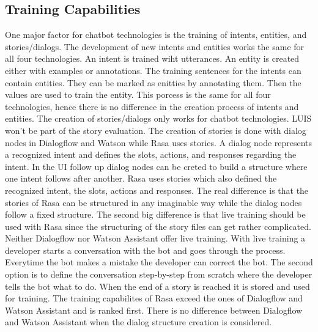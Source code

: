 \subsection*{Training Capabilities}
One major factor for chatbot technologies is the training of intents, entities, and stories/dialogs.
The development of new intents and entities works the same for all four technologies.
An intent is trained wiht utterances.
An entity is created either with examples or annotations.
The training sentences for the intents can contain entities.
They can be marked as enitties by annotating them.
Then the values are used to train the entity.
This porcess is the same for all four technologies, hence there is no 
difference in the creation process of intents and entities.
The creation of stories/dialogs only works for chatbot technologies.
LUIS won't be part of the story evaluation.
The creation of stories is done with dialog nodes in Dialogflow and Watson while
Rasa uses stories.
A dialog node represents a recognized intent and defines the slots, actions, and responses regarding 
the intent.
In the UI follow up dialog nodes can be creted to build a structure where one intent follows after another.
Rasa uses stories which also defined the recognized intent, the slots, actions and responses.
The real difference is that the stories of Rasa can be structured in any imaginable way while the 
dialog nodes follow a fixed structure.
The second big difference is that live training should be used with Rasa since the structuring of the story files can get 
rather complicated.
Neither Dialogflow nor Watson Assistant offer live training.
With live training a developer starts a conversation with the bot and goes through the process.
Everytime the bot makes a mistake the developer can correct the bot.
The second option is to define the conversation step-by-step from scratch where the developer tells the 
bot what to do.
When the end of a story is reached it is stored and used for training.
The training capabilites of Rasa exceed the ones of Dialogflow and Watson Assistant and is ranked first. 
There is no difference between Dialogflow and Watson Assistant when the dialog structure creation is considered.


